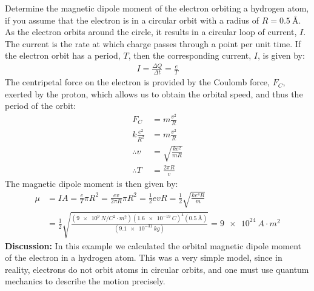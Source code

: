 \begin{example}{Determine the magnetic dipole moment of the electron orbiting a hydrogen atom, if you assume that the electron is in a circular orbit with a radius of $R=\SI{0.5}{\angstrom}$.}
As the electron orbits around the circle, it results in a circular loop of current, $I$. The current is the rate at which charge passes through a point per unit time. If the electron orbit has a period, $T$, then the corresponding current, $I$, is given by:
\begin{align*}
I=\frac{\Delta Q}{\Delta t} = \frac{e}{T}
\end{align*}
The centripetal force on the electron is provided by the Coulomb force, $F_C$, exerted by the proton, which allows us to obtain the orbital speed, and thus the period of the orbit:
\begin{align*}
F_C &= m\frac{v^2}{R}\\
k\frac{e^2}{R^2}&= m\frac{v^2}{R}\\
\therefore v &=\sqrt{\frac{ke^2}{mR}}\\
\therefore T &= \frac{2\pi R}{v}
\end{align*}
The magnetic dipole moment is then given by:
\begin{align*}
\mu &= IA = \frac{e}{T} \pi R^2 = \frac{ev}{2\pi R} \pi R^2=\frac{1}{2} evR=\frac{1}{2} \sqrt{\frac{ke^4R}{m}}\\
&=\frac{1}{2} \sqrt{\frac{(\SI{9e9}{N/C^{2}\cdot m^2})(\SI{1.6e-19}{C})^4(\SI{0.5}{\angstrom})}{(\SI{9.1e-31}{kg})}}=\SI{9e24}{A\cdot m^2}
\end{align*}
\textbf{Discussion:} In this example we calculated the orbital magnetic dipole moment of the electron in a hydrogen atom. This was a very simple model, since in reality, electrons do not orbit atoms in circular orbits, and one must use quantum mechanics to describe the motion precisely. 
\end{example}

